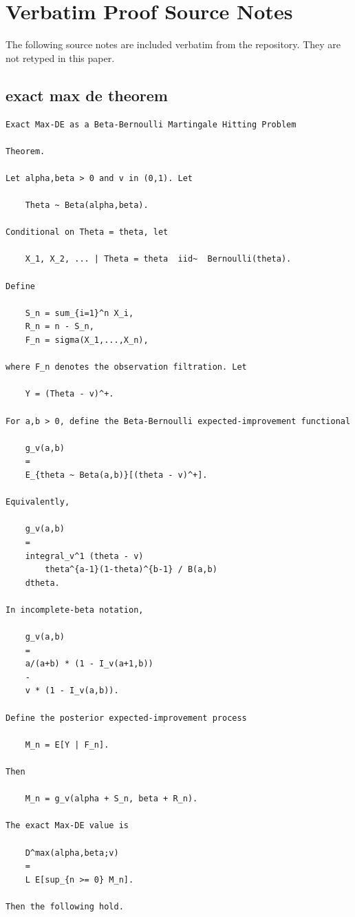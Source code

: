 \section{Verbatim Proof Source Notes}
\label{app:proofs}
The following source notes are included verbatim from the repository. They are not retyped in this paper.
\subsection{exact max de theorem}
\begin{small}
\begin{verbatim}
Exact Max-DE as a Beta-Bernoulli Martingale Hitting Problem

Theorem.

Let alpha,beta > 0 and v in (0,1). Let

    Theta ~ Beta(alpha,beta).

Conditional on Theta = theta, let

    X_1, X_2, ... | Theta = theta  iid~  Bernoulli(theta).

Define

    S_n = sum_{i=1}^n X_i,
    R_n = n - S_n,
    F_n = sigma(X_1,...,X_n),

where F_n denotes the observation filtration. Let

    Y = (Theta - v)^+.

For a,b > 0, define the Beta-Bernoulli expected-improvement functional

    g_v(a,b)
    =
    E_{theta ~ Beta(a,b)}[(theta - v)^+].

Equivalently,

    g_v(a,b)
    =
    integral_v^1 (theta - v)
        theta^{a-1}(1-theta)^{b-1} / B(a,b)
    dtheta.

In incomplete-beta notation,

    g_v(a,b)
    =
    a/(a+b) * (1 - I_v(a+1,b))
    -
    v * (1 - I_v(a,b)).

Define the posterior expected-improvement process

    M_n = E[Y | F_n].

Then

    M_n = g_v(alpha + S_n, beta + R_n).

The exact Max-DE value is

    D^max(alpha,beta;v)
    =
    L E[sup_{n >= 0} M_n].

Then the following hold.


\end{verbatim}
\end{small}
